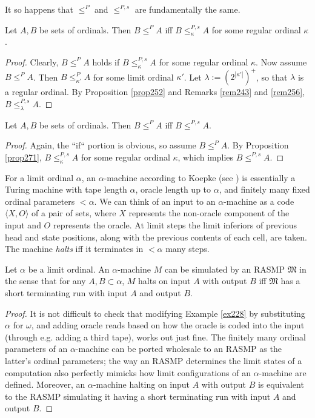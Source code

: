 \documentclass[12pt]{article}
\numberwithin{equation}{section}
\begin{document}
It so happens that $\leq^P$ and $\leq^{P, s}$ are fundamentally the same.

\begin{prop}\label{prop271}
Let $A, B$ be sets of ordinals. Then $B \leq^P A$ iff $B \leq^{P, s}_{\kappa} A$ for some regular ordinal $\kappa$.
\end{prop}

\begin{proof}
Clearly, $B \leq^P A$ holds if $B \leq^{P, s}_{\kappa} A$ for some regular ordinal $\kappa$. Now assume $B \leq^P A$. Then $B \leq^P_{\kappa'} A$ for some limit ordinal $\kappa'$. Let $\lambda := (2^{|\kappa'|})^+$, so that $\lambda$ is a regular ordinal. By Proposition \ref{prop252} and Remarks \ref{rem243} and \ref{rem256}, $B \leq^{P, s}_{\lambda} A$.
\end{proof}

\begin{prop}
Let $A, B$ be sets of ordinals. Then $B \leq^P A$ iff $B \leq^{P, s} A$.
\end{prop}

\begin{proof}
Again, the ``if`` portion is obvious, so assume $B \leq^P A$. By Proposition \ref{prop271}, $B \leq^{P, s}_{\kappa} A$ for some regular ordinal $\kappa$, which implies $B \leq^{P, s} A$.
\end{proof}

For a limit ordinal $\alpha$, an $\alpha$-machine according to Koepke (see \cite{koepke2}) is essentially a Turing machine with tape length $\alpha$, oracle length up to $\alpha$, and finitely many fixed ordinal parameters $< \alpha$. We can think of an input to an $\alpha$-machine as a code $\langle X, O \rangle$ of a pair of sets, where $X$ represents the non-oracle component of the input and $O$ represents the oracle. At limit steps the limit inferiors of previous head and state positions, along with the previous contents of each cell, are taken. The machine \emph{halts} iff it terminates in $< \alpha$ many steps.

\begin{prop}\label{prop270}
Let $\alpha$ be a limit ordinal. An $\alpha$-machine $M$ can be simulated by an RASMP $\mathfrak{M}$ in the sense that for any $A, B \subset \alpha$, $M$ halts on input $A$ with output $B$ iff $\mathfrak{M}$ has a short terminating run with input $A$ and output $B$.
\end{prop}

\begin{proof}
It is not difficult to check that modifying Example \ref{ex228} by substituting $\alpha$ for $\omega$, and adding oracle reads based on how the oracle is coded into the input (through e.g. adding a third tape), works out just fine. The finitely many ordinal parameters of an $\alpha$-machine can be ported wholesale to an RASMP as the latter's ordinal parameters; the way an RASMP determines the limit states of a computation also perfectly mimicks how limit configurations of an $\alpha$-machine are defined. Moreover, an $\alpha$-machine halting on input $A$ with output $B$ is equivalent to the RASMP simulating it having a short terminating run with input $A$ and output $B$.
\end{proof}
\end{document}
